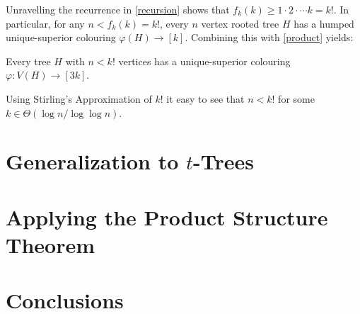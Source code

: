 \documentclass[kpfonts]{patmorin}
\begin{document}
Unravelling the recurrence in \cref{recursion} shows that $f_k(k)\ge 1\cdot2\cdot\cdots k=k!$.  In particular, for any $n < f_k(k)=k!$, every $n$ vertex rooted tree $H$ has a humped unique-superior colouring $\varphi(H)\to[k]$. Combining this with \cref{product} yields:

\begin{thm}[\cite{X}]
    Every tree $H$ with $n<k!$ vertices has a unique-superior colouring $\varphi:V(H)\to[3k]$.
\end{thm}

Using Stirling's Approximation of $k!$ it easy to see that $n < k!$ for some $k\in\Theta(\log n/\log\log n)$.

\section{Generalization to $t$-Trees}



\section{Applying the Product Structure Theorem}


\section{Conclusions}
\end{document}
